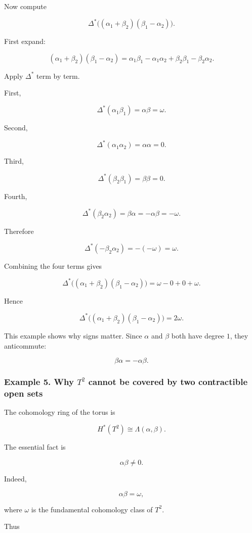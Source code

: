 \documentclass[12pt,a4paper]{article}
\theoremstyle{notespace}
\begin{document}
Now compute

\[
\Delta^*\bigl((\alpha_1+\beta_2)(\beta_1-\alpha_2)\bigr).
\]

First expand:

\[
(\alpha_1+\beta_2)(\beta_1-\alpha_2)
=
\alpha_1\beta_1
-
\alpha_1\alpha_2
+
\beta_2\beta_1
-
\beta_2\alpha_2.
\]

Apply \(\Delta^*\) term by term.

First,

\[
\Delta^*(\alpha_1\beta_1)
=
\alpha\beta
=
\omega.
\]

Second,

\[
\Delta^*(\alpha_1\alpha_2)
=
\alpha\alpha
=
0.
\]

Third,

\[
\Delta^*(\beta_2\beta_1)
=
\beta\beta
=
0.
\]

Fourth,

\[
\Delta^*(\beta_2\alpha_2)
=
\beta\alpha
=
-\alpha\beta
=
-\omega.
\]

Therefore

\[
\Delta^*(-\beta_2\alpha_2)
=
-(-\omega)
=
\omega.
\]

Combining the four terms gives

\[
\Delta^*\bigl((\alpha_1+\beta_2)(\beta_1-\alpha_2)\bigr)
=
\omega-0+0+\omega.
\]

Hence

\[
\boxed{
	\Delta^*\bigl((\alpha_1+\beta_2)(\beta_1-\alpha_2)\bigr)
	=
	2\omega.
}
\]

This example shows why signs matter. Since \(\alpha\) and \(\beta\) both have degree \(1\), they anticommute:

\[
\beta\alpha=-\alpha\beta.
\]

\subsubsection{Example 5. Why \(T^2\) cannot be covered by two contractible open sets}

The cohomology ring of the torus is

\[
H^*(T^2)
\cong
\Lambda(\alpha,\beta).
\]

The essential fact is

\[
\alpha\beta\neq 0.
\]

Indeed,

\[
\alpha\beta=\omega,
\]

where \(\omega\) is the fundamental cohomology class of \(T^2\).

Thus
\end{document}
